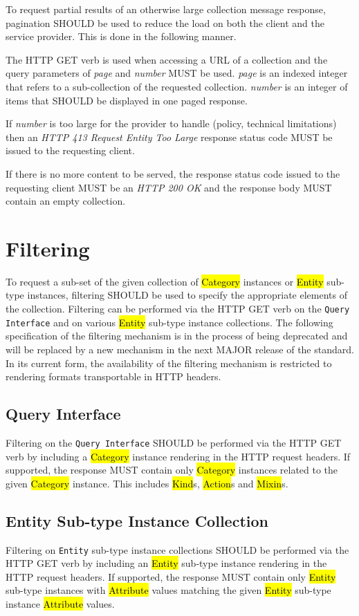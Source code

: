 \documentclass[10pt,a4paper]{article}
\begin{document}
To request partial results of an otherwise large collection message response, pagination SHOULD be used to reduce the load on
both the client and the service provider. This is done in the following manner.

The HTTP GET verb is used when accessing a URL of a collection and the query parameters of {\em page} and {\em number} MUST be used. {\em page} is an indexed
integer that refers to a sub-collection of the requested collection. {\em number} is an integer of items that SHOULD be displayed in one paged response.


If {\em number} is too large for the provider to handle (policy, technical limitations) then an \emph{HTTP 413 Request Entity Too Large} response status code MUST be issued to the requesting client.

If there is no more content to be served, the response status code issued to the requesting client MUST be an \emph{HTTP 200 OK} and the response body MUST contain an empty collection.

\section{Filtering}
To request a sub-set of the given collection of \hl{Category} instances or \hl{Entity} sub-type instances, filtering SHOULD be used to
specify the appropriate elements of the collection. Filtering can be performed via the HTTP GET verb on the {\tt Query Interface} and
on various \hl{Entity} sub-type instance collections. The following specification of the filtering mechanism is in the process of being
deprecated and will be replaced by a new mechanism in the next MAJOR release of the standard. In its current form, the availability of
the filtering mechanism is restricted to rendering formats transportable in HTTP headers.

\subsection{Query Interface}
Filtering on the {\tt Query Interface} SHOULD be performed via the HTTP GET verb by including a \hl{Category} instance rendering
in the HTTP request headers. If supported, the response MUST contain only \hl{Category} instances related to the given \hl{Category}
instance. This includes \hl{Kind}s, \hl{Action}s and \hl{Mixin}s.

\subsection{Entity Sub-type Instance Collection}
Filtering on {\tt Entity} sub-type instance collections SHOULD be performed via the HTTP GET verb by including an \hl{Entity} sub-type
instance rendering in the HTTP request headers. If supported, the response MUST contain only \hl{Entity} sub-type instances
with \hl{Attribute} values matching the given \hl{Entity} sub-type instance \hl{Attribute} values.
\end{document}
